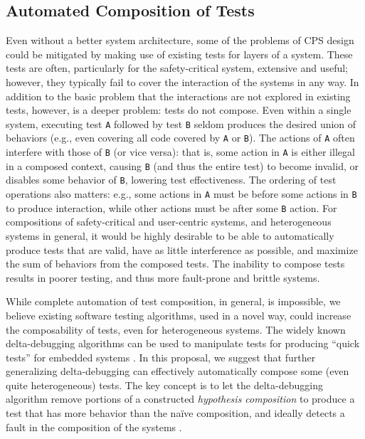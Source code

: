 \subsection{Automated Composition of Tests}
Even without a better system architecture, some of the problems of CPS design could be mitigated by making use of existing tests for layers of a system.  These tests are often,
particularly for the safety-critical system, extensive and useful;
however, they typically fail to cover the interaction of the systems
in any way.  In addition to the basic problem that the interactions
are not explored in existing tests, however, is a deeper problem:
tests do not compose.  Even within a single system, executing test
{\tt A}
followed by test {\tt B} seldom produces the desired union of behaviors
(e.g., even covering all code covered by {\tt A} or {\tt B}).  The
actions of {\tt A}
often interfere with those of {\tt B} (or vice versa): that is, some action
in {\tt A} is either illegal in a composed context, causing {\tt B} (and thus the
entire test) to become invalid, or
disables some behavior of {\tt B}, lowering test effectiveness.  The
ordering of test operations also matters: e.g., some actions in {\tt A} must be
before some actions in {\tt B} to produce interaction, while other actions
must be after some {\tt B} action.    For compositions of safety-critical and
user-centric systems, and heterogeneous systems in general, it would
be highly desirable to be able to automatically produce tests that are
valid, have as little interference as possible, and maximize the sum
of behaviors from the composed tests.  The inability to compose tests
results in poorer testing, and thus more fault-prone and brittle
systems.

While complete automation of test composition, in general, is
impossible, we 
believe existing software testing algorithms, used in a  novel
way, could increase the composability of tests, even for
heterogeneous systems.  The widely known delta-debugging algorithms can
be used to manipulate tests for producing ``quick tests'' for embedded
systems \cite{icst2014}.  In this proposal, we suggest that further generalizing
delta-debugging can effectively automatically compose some (even quite heterogeneous) tests.  The key
concept is to let the delta-debugging algorithm remove portions of a
constructed \emph{hypothesis composition} to produce a test that has more
behavior than the na\"ive composition, and ideally detects a fault in
the composition of the systems \cite{tecpscompose}.

